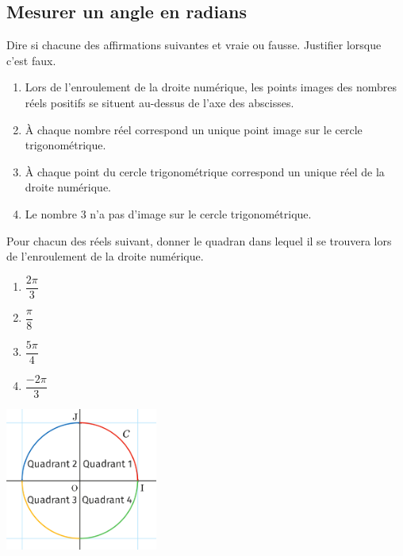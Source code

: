 \documentclass[a4paper,11pt,exos]{nsi} %
\begin{document}
\setlength{\columnseprule}{0pt}
\setlength{\columnsep}{1cm}

\maketitle


\subsection*{Mesurer un angle en radians}

\exo{}
Dire si chacune des affirmations suivantes et vraie ou fausse. Justifier lorsque c'est faux.
\begin{enumerate}
	\item 	Lors de l'enroulement de la droite numérique, les points images des nombres réels positifs se situent au-dessus de l'axe des abscisses.
	\item 	À chaque nombre réel correspond un unique point image sur le cercle trigonométrique.
	\item	À chaque point du cercle trigonométrique correspond un unique réel de la droite numérique.
	\item	Le nombre 3 n'a pas d'image sur le cercle trigonométrique. 
\end{enumerate}


\begin{minipage}{12cm}
	\exo{}
	Pour chacun des réels suivant, donner le quadran dans lequel il se trouvera lors de l'enroulement de la droite numérique.
	\begin{multicols}{2}
		\begin{enumerate}
			\item 	$\dfrac{2\pi}{3}$
			\item 	$\dfrac{\pi}{8}$
			\item	$\dfrac{5\pi}{4}$
			\item	$\dfrac{-2\pi}{3}$
		\end{enumerate}
	\end{multicols}
	
\end{minipage}
\begin{minipage}{5cm}
	\includegraphics[width=5cm]{quadrants}
\end{minipage}
\end{document}
